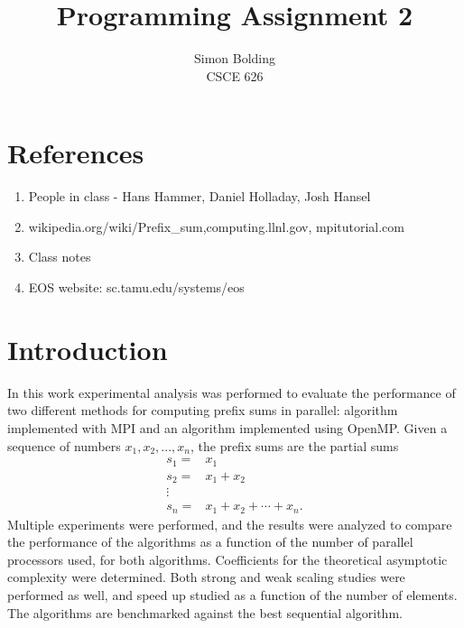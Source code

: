 \documentclass[12pt]{article}
\begin{document}
 
 
\title{Programming Assignment 2}%
\author{Simon Bolding\\ %
CSCE 626} %
 
\maketitle

\clearpage

%

\section*{References}

\begin{enumerate}
	\item People in class - Hans Hammer, Daniel Holladay, Josh Hansel
	\item wikipedia.org/wiki/Prefix\_sum,computing.llnl.gov, mpitutorial.com
    \item Class notes
    \item EOS website: sc.tamu.edu/systems/eos
\end{enumerate}

\section{Introduction}

In this work experimental analysis was performed to evaluate the performance
of two different methods for computing prefix sums in parallel: 
algorithm implemented with MPI and an algorithm implemented using OpenMP.  Given a sequence of numbers $x_1, x_2, ..., x_n$, the prefix sums are the partial sums 
\begin{align*}
s_1 =&x_1  \\
s_2 =& x_1 + x_2  \\
\vdots& \\
s_n =& x_1 + x_2 + \cdots + x_n .
\end{align*}
Multiple experiments were performed, and the results were analyzed to compare the performance of the algorithms 
as a function of the number of parallel processors used, for both algorithms.
Coefficients for the theoretical asymptotic complexity were determined. Both strong
and weak scaling studies were performed as well, and speed up studied as a function
of the number of elements. The
algorithms are benchmarked against the best sequential algorithm.
\end{document}
